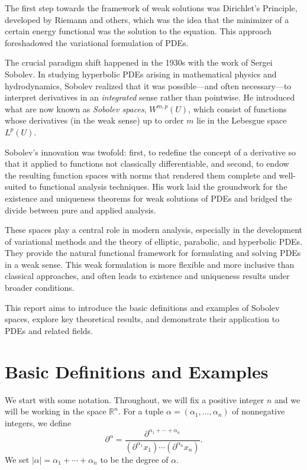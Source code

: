 \documentclass[12pt,letterpaper,reqno]{article}
\theoremstyle{plain}                              %
\theoremstyle{definition}                         %
\theoremstyle{remark}                             %
\numberwithin{equation}{section}
\newcommand{\R}{\mathbb{R}}                     %
\begin{document}
The first step towards the framework of weak solutions was Dirichlet's Principle, developed by Riemann and others, which was the idea that the minimizer of a certain energy functional was the solution to the equation. This approach foreshadowed the variational formulation of PDEs.

The crucial paradigm shift happened in the 1930s with the work of Sergei Sobolev. In studying hyperbolic PDEs arising in mathematical physics and hydrodynamics, Sobolev realized that it was possible—and often necessary—to interpret derivatives in an \emph{integrated} sense rather than pointwise. He introduced what are now known as \emph{Sobolev spaces}, \( W^{m,p}(U) \), which consist of functions whose derivatives (in the weak sense) up to order \( m \) lie in the Lebesgue space \( L^p(U) \).

Sobolev’s innovation was twofold: first, to redefine the concept of a derivative so that it applied to functions not classically differentiable, and second, to endow the resulting function spaces with norms that rendered them complete and well-suited to functional analysis techniques. His work laid the groundwork for the existence and uniqueness theorems for weak solutions of PDEs and bridged the divide between pure and applied analysis.

These spaces play a central role in modern analysis, especially in the development of variational methods and the theory of elliptic, parabolic, and hyperbolic PDEs. They provide the natural functional framework for formulating and solving PDEs in a weak sense. This weak formulation is more flexible and more inclusive than classical approaches, and often leads to existence and uniqueness results under broader conditions.

This report aims to introduce the basic definitions and examples of Sobolev spaces, explore key theoretical results, and demonstrate their application to PDEs and related fields.

    

\section{Basic Definitions and Examples}


We start with some notation. Throughout, we will fix a positive integer $n$ and we will be working in the space $\R^n$. For a tuple $\alpha=(\alpha_1,\ldots,\alpha_n)$ of nonnegative integers, we define \[\partial^\alpha  = \frac{\partial^{\alpha_1+\cdots+\alpha_n}}{(\partial^{\alpha_1}x_1)\cdots (\partial^{\alpha_n}x_n)}.\] We set $|\alpha| = \alpha_1+\cdots +\alpha_n$ to be the degree of $\alpha$.
\end{document}
